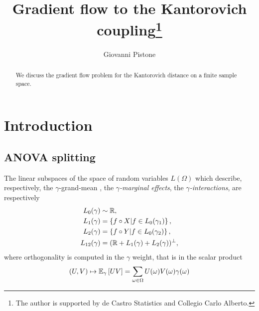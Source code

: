 \documentclass[runningheads]{llncs}
\begin{document}
%
\title{Gradient flow to the Kantorovich coupling\thanks{The author is
    supported by de Castro Statistics and Collegio Carlo Alberto.}}
%
%
\author{Giovanni Pistone}
%
%
%
\maketitle              %
%
\begin{abstract}
We discuss the gradient flow problem for the Kantorovich distance on a
finite sample space.

\end{abstract}
%
%
%
\section{Introduction}

\subsection{ANOVA splitting}
%
The linear subspaces of the space of random variables $L(\Omega)$ which describe, respectively, the $\gamma$-grand-mean , the \emph{$\gamma$-marginal effects}, the \emph{$\gamma$-interactions}, are respectively
%
\begin{equation}\label{eq:ANOVA-spaces}
\begin{aligned}
  L_0(\gamma) &\sim \mathbb R, \\
  L_1(\gamma) &= \left\{ f\circ X \middle| f \in L_0(\gamma_1) \right\},\\
  L_2(\gamma) &= \left\{ f\circ Y \middle| f \in L_0(\gamma_2) \right\},\\
  L_{12}(\gamma) &= (\mathbb R + L_1(\gamma) + L_2(\gamma))^\perp,
\end{aligned}
\end{equation}
%
where orthogonality is computed in the $\gamma$ weight, that is in the scalar product
\begin{equation*}
(U,V) \mapsto {\operatorname{\mathbb E}}_{\gamma}\left[UV\right] = \sum_{\omega\in\Omega}U(\omega)V(\omega)
\gamma(\omega)\end{equation*}
\end{document}
